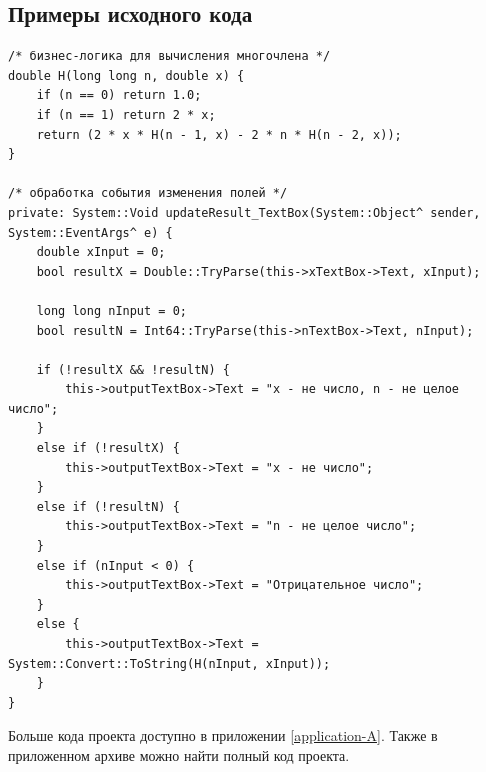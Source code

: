 \subsection{Примеры исходного кода}
\begin{verbatim}
/* бизнес-логика для вычисления многочлена */
double H(long long n, double x) {
    if (n == 0) return 1.0;
    if (n == 1) return 2 * x;
    return (2 * x * H(n - 1, x) - 2 * n * H(n - 2, x));
}

/* обработка события изменения полей */
private: System::Void updateResult_TextBox(System::Object^ sender, System::EventArgs^ e) {
    double xInput = 0;
    bool resultX = Double::TryParse(this->xTextBox->Text, xInput);
    
    long long nInput = 0;
    bool resultN = Int64::TryParse(this->nTextBox->Text, nInput);
    
    if (!resultX && !resultN) {
        this->outputTextBox->Text = "x - не число, n - не целое число";
    }
    else if (!resultX) {
        this->outputTextBox->Text = "x - не число";
    }
    else if (!resultN) {
        this->outputTextBox->Text = "n - не целое число";
    }
    else if (nInput < 0) {
        this->outputTextBox->Text = "Отрицательное число";
    }
    else {
        this->outputTextBox->Text = System::Convert::ToString(H(nInput, xInput));
    }
}
\end{verbatim}

Больше кода проекта доступно в приложении \ref{application-A}. Также в приложенном архиве можно найти полный код проекта.